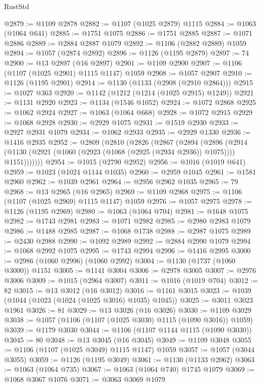 \begin{lexlean}{RustStd}
\begin{coremodule}
@2879 := @1109 @2878
@2882 := @1107 (@1025 @2879) @1115
@2884 := @1063 (@1064 @641)
@2885 := @1751 @1075
@2886 := @1751 @2885
@2887 := @1071 @2886
@2889 := @2884 @2887 @1079
@2892 := @1106 (@2882 @2889) @1059
@2894 := @1057 (@2874 @2892)
@2896 := @1126 (@1195 @2879)
@2897 := 74
@2900 := @13 @2897 (@16 @2897)
@2901 := @1109 @2900
@2907 := @1106 (@1107 (@1025 @2901) @1115 @1147) @1059
@2908 := @1057 @2907
@2910 := @1126 (@1195 @2901)
@2914 := @1130 (@1133 (@2908 (@2910 @2864)))
@2915 := @1027 @363
@2920 := @1142 (@1212 (@1214 (@1025 @2915) @1249))
@2921 := @1131 @2920
@2923 := @1134 (@1546 @1052)
@2924 := @1072 @2868
@2925 := @1062 @2924
@2927 := @1063 (@1064 @668)
@2928 := @1072 @2915
@2929 := @1068 @2928
@2930 := @2929 @1075
@2931 := @1519 @2930
@2933 := @2927 @2931 @1079
@2934 := @1062 @2933
@2935 := @2929 @1330
@2936 := @1416 @2935
@2952 := @2809
    (@2810
      (@2826
        (@2867
          (@2894
            (@2896
              (@2914 (@1130 (@2921 (@1060 (@2923 (@1068 (@2925 (@2934 @2936)) @1075)))) @1151)))))))
@2954 := @1015 (@2790 @2952)
@2956 := @1016 (@1019 @641)
@2959 := @1023 (@1024 @1144 @1035)
@2960 := @2959 @1045
@2961 := @1581 @2960
@2962 := @1039 @2961
@2964 := @2956 @2962 @1035
@2965 := 79
@2968 := @13 @2965 (@16 @2965)
@2969 := @1109 @2968
@2975 := @1106 (@1107 (@1025 @2969) @1115 @1147) @1059
@2976 := @1057 @2975
@2978 := @1126 (@1195 @2969)
@2980 := @1063 (@1064 @704)
@2981 := @1648 @1075
@2982 := @1743 @2981
@2983 := @1071 @2982
@2985 := @2980 @2983 @1079
@2986 := @1488 @2985
@2987 := @1068 @1738
@2988 := @2987 @1075
@2989 := @2430 @2988
@2990 := @1092 @2989
@2992 := @2884 @2990 @1079
@2994 := @1068 @2992 @1075
@2995 := @1743 @2994
@2996 := @1416 @2995
@3000 := @2986 (@1060 @2996) (@1060 @2992)
@3004 := @1130 (@1737 (@1060 @3000)) @1151
@3005 := @1141 @3004
@3006 := @2978 @3005
@3007 := @2976 @3006
@3009 := @1015 (@2964 @3007)
@3011 := @1016 (@1019 @704)
@3012 := 82
@3015 := @13 @3012 (@16 @3012)
@3016 := @1161 @3015
@3023 := @1039 (@1044 (@1023 (@1024 (@1025 @3016) @1035) @1045))
@3025 := @3011 @3023 @1961
@3026 := 81
@3029 := @13 @3026 (@16 @3026)
@3030 := @1109 @3029
@3038 := @1057 (@1106 (@1107 (@1025 @3030) @1115 (@1090 @3016)) @1059)
@3039 := @1179 @3030
@3044 := @1106 (@1107 @1144 @1115 (@1090 @3030))
@3045 := 80
@3048 := @13 @3045 (@16 @3045)
@3049 := @1109 @3048
@3055 := @1106 (@1107 (@1025 @3049) @1115 @1147) @1059
@3057 := @1057 (@3044 @3055)
@3059 := @1126 (@1195 @3049)
@3061 := @1130 (@1133 @2062)
@3063 := @1063 (@1064 @735)
@3067 := @1063 (@1064 @740) @1745 @1079
@3069 := @1068 @3067 @1076
@3071 := @3063 @3069 @1079

\end{coremodule}
\end{lexlean}
